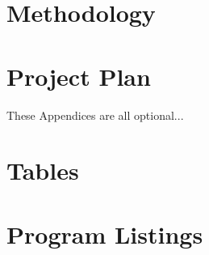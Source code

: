 \documentclass[11pt, a4paper]{article}
\begin{document}
\section{Methodology}

\section{Project Plan}










%






\newpage
\appendix
\appendixpage
\addappheadtotoc

These Appendices are all optional...

\section{Tables}


\section{Program Listings}
\end{document}
